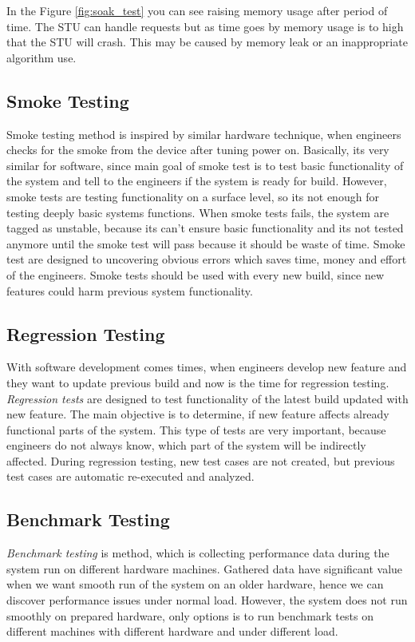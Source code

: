 In the Figure \ref{fig:soak_test} you can see raising memory usage after period of time. The STU can handle requests but as time goes by memory usage is to high that the STU will crash. This may be caused by memory leak or an inappropriate algorithm use.

\subsection*{Smoke Testing}
Smoke testing method is inspired by similar hardware technique, when engineers checks for the smoke from the device after tuning power on. Basically, its very similar for software, since main goal of smoke test is to test basic functionality of the system and tell to the engineers if the system is ready for build. However, smoke tests are testing functionality on a surface level, so its not enough for testing deeply basic systems functions. When smoke tests fails, the system are tagged as unstable, because its can't ensure basic functionality and its not tested anymore until the smoke test will pass because it should be waste of time. Smoke test are designed to uncovering obvious errors which saves time, money and effort of the engineers. Smoke tests should be used with every new build, since new features could harm previous system functionality. 


\subsection*{Regression Testing}
With software development comes times, when engineers develop new feature and they want to update previous build and now is the time for regression testing. \emph{Regression tests} \cite{STF:REGRESSION} are designed to test functionality of the latest build updated with new feature. The main objective is to determine, if new feature affects already functional parts of the system. This type of tests are very important, because engineers do not always know, which part of the system will be indirectly affected. During regression testing, new test cases are not created, but previous test cases are automatic re-executed and analyzed. 


\subsection*{Benchmark Testing}
\emph{Benchmark testing} \cite{Aho:Benchmarking} is method, which is collecting performance data during the system run on different hardware machines. Gathered data have significant value when we want smooth run of the system on an older hardware, hence we can discover performance issues under normal load. However, the system does not run smoothly on prepared hardware, only options is to run benchmark tests on different machines with different hardware and under different load.

